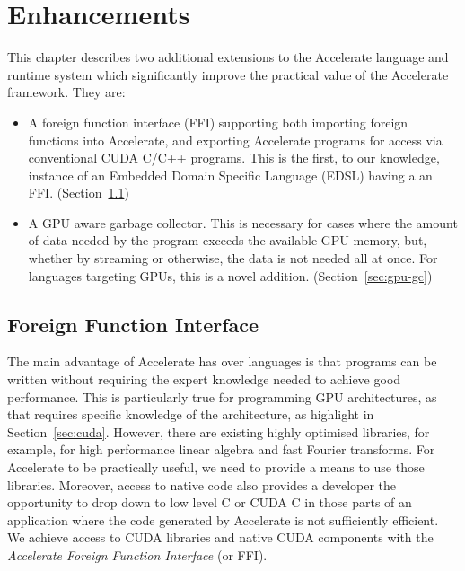 \chapter{Enhancements}
\label{chap:enhancements}

This chapter describes two additional extensions to the Accelerate language and runtime system which significantly improve the practical value of the Accelerate framework. They are:
%
\begin{itemize}
\item A foreign function interface (FFI) supporting both importing foreign functions into Accelerate, and exporting Accelerate programs for access via conventional CUDA C/C++ programs. This is the first, to our knowledge, instance of an Embedded Domain Specific Language (EDSL) having a an FFI. (Section~\ref{sec:foreign})
\item A GPU aware garbage collector. This is necessary for cases where the amount of data needed by the program exceeds the available GPU memory, but, whether by streaming or otherwise, the data is not needed all at once. For languages targeting GPUs, this is  a novel addition. (Section~\ref{sec:gpu-gc})
\end{itemize}


\section{Foreign Function Interface}
\label{sec:foreign}


The main advantage of Accelerate has over languages is that programs can be written without requiring the expert knowledge needed to achieve good performance. This is particularly true for programming GPU architectures, as that requires specific knowledge of the architecture, as highlight in Section~\ref{sec:cuda}. However, there are existing highly optimised libraries, for example, for high performance linear algebra and fast Fourier transforms. For Accelerate to be practically useful, we need to provide a means to use those libraries. Moreover, access to native code also provides a developer the opportunity to drop down to low level C or CUDA C in those parts of an application where the code generated by Accelerate is not sufficiently efficient. We achieve access to CUDA libraries and native CUDA components with the \emph{Accelerate Foreign Function Interface} (or FFI).

